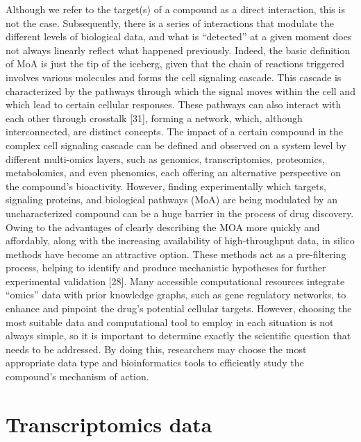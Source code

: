 Although we refer to the target(s) of a compound as a direct interaction, this is not the case. Subsequently, there is a series of interactions that modulate the different levels of biological data, and what is “detected” at a given moment does not always linearly reflect what happened previously. Indeed, the basic definition of MoA is just the tip of the iceberg, given that the chain of reactions triggered involves various molecules and forms the cell signaling cascade. This cascade is characterized by the pathways through which the signal moves within the cell and which lead to certain cellular responses. These pathways can also interact with each other through crosstalk [31], forming a network, which, although interconnected, are distinct concepts. The impact of a certain compound in the complex cell signaling cascade can be defined and observed on a system level by different multi-omics layers, such as genomics, transcriptomics, proteomics, metabolomics, and even phenomics, each offering an alternative perspective on the compound’s bioactivity. However, finding experimentally which targets, signaling proteins, and biological pathways (MoA) are being modulated by an uncharacterized compound can be a huge barrier in the process of drug discovery. Owing to the advantages of clearly describing the MOA more quickly and affordably, along with the increasing availability of high-throughput data, in silico methods have become an attractive option. These methods act as a pre-filtering process, helping to identify and produce mechanistic hypotheses for further experimental validation [28]. Many accessible computational resources integrate “omics” data with prior knowledge graphs, such as gene regulatory networks, to enhance and pinpoint the drug's potential cellular targets. However, choosing the most suitable data and computational tool to employ in each situation is not always simple, so it is important to determine exactly the scientific question that needs to be addressed. By doing this, researchers may choose the most appropriate data type and bioinformatics tools to efficiently study the compound's mechanism of action.

\section{Transcriptomics data}
\label{sec:Transcriptomics_data}

